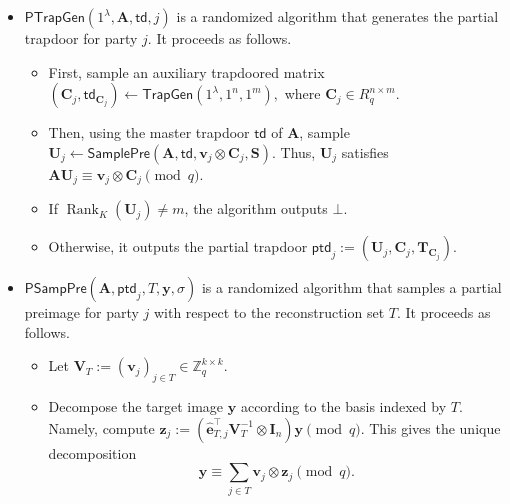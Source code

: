 \begin{itemize}
    \item $\mathsf{PTrapGen}(1^\lambda,\mathbf{A},\mathsf{td},j)$ is a randomized
    algorithm that generates the partial trapdoor for party $j$. It proceeds as
    follows.

    \begin{itemize}
        \item First, sample an auxiliary trapdoored matrix
        $
            (\mathbf{C}_j,\mathsf{td}_{\mathbf{C}_j})
            \gets
            \mathsf{TrapGen}(1^\lambda,1^n,1^m),
        $
        where $\mathbf{C}_j\in R_q^{n\times m}$.

        \item Then, using the master trapdoor $\mathsf{td}$ of $\mathbf{A}$,
        sample
        $
            \mathbf{U}_j
            \gets
            \mathsf{SamplePre}
            (\mathbf{A},\mathsf{td},
            \mathbf{v}_j\otimes \mathbf{C}_j,\mathbf{S}).
        $
        Thus, $\mathbf{U}_j$ satisfies
        $
            \mathbf{A}\mathbf{U}_j
            \equiv
            \mathbf{v}_j\otimes \mathbf{C}_j
            \pmod q.
        $

        \item If $\operatorname{Rank}_{K}(\mathbf{U}_j)\neq m$, the algorithm
        outputs $\bot$.

        \item Otherwise, it outputs the partial trapdoor
        $
            \mathsf{ptd}_j
            :=
            \left(
                \mathbf{U}_j,
                \mathbf{C}_j,
                \mathbf{T}_{\mathbf{C}_j}
            \right).
        $
    \end{itemize}

    \item $\mathsf{PSampPre}(\mathbf{A},\mathsf{ptd}_j,T,\mathbf{y},\sigma)$
    is a randomized algorithm that samples a partial preimage for party $j$
    with respect to the reconstruction set $T$. It proceeds as follows.

    \begin{itemize}
        \item Let
        $
            \mathbf{V}_T := (\mathbf{v}_j)_{j\in T}
            \in \mathbb{Z}_q^{k\times k}.
        $

        \item Decompose the target image $\mathbf{y}$ according to the basis
        indexed by $T$. Namely, compute
        $
            \mathbf{z}_j
            :=
            \left(
                \widehat{\mathbf{e}}_{T,j}^{\top}
                \mathbf{V}_T^{-1}
                \otimes \mathbf{I}_n
            \right)\mathbf{y}
            \pmod q.
        $
        This gives the unique decomposition
        \[
            \mathbf{y}
            \equiv
            \sum_{j\in T}\mathbf{v}_j\otimes \mathbf{z}_j
            \pmod q.
        \]


\end{itemize}
\end{itemize}
